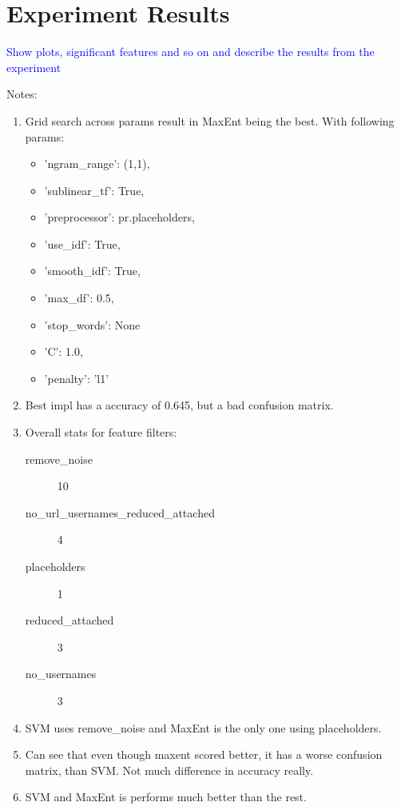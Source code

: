 \section{Experiment Results}
\textcolor{blue}{Show plots, significant features and so on and describe the results from the experiment}

Notes:
\begin{enumerate}
\item Grid search across params result in MaxEnt being the best. With following params:
	\begin{itemize}
		\item 'ngram\_range': (1,1),
		\item  'sublinear\_tf': True,
		\item  'preprocessor': pr.placeholders,
		\item  'use\_idf': True,
		\item  'smooth\_idf': True,
		\item  'max\_df': 0.5,
		\item  'stop\_words': None
	\end{itemize}
	\begin{itemize}
		\item 'C': 1.0,
		\item 'penalty': 'l1'
	\end{itemize}

\item Best impl has a accuracy of 0.645, but a bad confusion matrix.

\item Overall stats for feature filters:
	\begin{description}
		\item[remove\_noise] 10
		\item[no\_url\_usernames\_reduced\_attached] 4
		\item[placeholders] 1
		\item[reduced\_attached] 3
		\item[no\_usernames] 3
	\end{description}

\item SVM uses remove\_noise and MaxEnt is the only one using placeholders. 

\item Can see that even though maxent scored better, it has a worse confusion matrix, than SVM. Not much difference in accuracy really. 

\item SVM and MaxEnt is performs much better than the rest. 
\end{enumerate}

